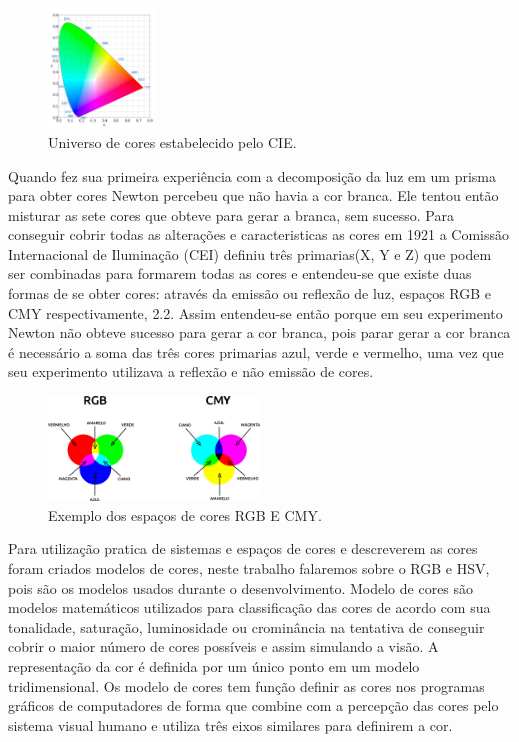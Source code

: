  \begin{figure}[!h]
	\centering
	\includegraphics[width=0.25\textwidth]{graficocie.pdf}
	\caption{Universo de cores estabelecido pelo CIE.}
	\label{EspacodeCores}
\end{figure}


Quando fez sua primeira experiência com a decomposição da luz em um prisma para obter cores Newton percebeu que não havia a cor branca. Ele tentou então misturar as sete cores que obteve para gerar a branca, sem sucesso. 
 Para conseguir cobrir todas as alterações e caracteristicas as cores em 1921 a Comissão Internacional de Iluminação (CEI)\cite{Souto:2003} definiu três primarias(X, Y e Z) que podem ser combinadas para formarem todas as cores e entendeu-se que existe duas formas de se obter cores: através da emissão ou reflexão de luz, espaços RGB e CMY respectivamente, \figurename{ 2.2}. Assim entendeu-se então porque em seu experimento Newton não obteve sucesso para gerar a cor branca, pois parar gerar a cor branca é necessário a soma das três cores primarias azul, verde e vermelho, uma vez que seu experimento utilizava a reflexão e não emissão de cores.
 \begin{figure}[!h]
	\centering
	\includegraphics[width=0.5\textwidth]{espacos.pdf}
	\caption{Exemplo dos espaços de cores RGB E CMY.}
	\label{EspacodeCores}
\end{figure}



Para utilização pratica de sistemas e espaços de cores e descreverem as cores foram criados modelos de cores, neste trabalho falaremos sobre o RGB e HSV, pois são os modelos usados durante o desenvolvimento.
Modelo de cores são modelos matemáticos utilizados para classificação das cores de acordo com sua tonalidade, saturação, luminosidade ou crominância na tentativa de conseguir cobrir o maior número de cores possíveis e assim simulando a visão. A representação da cor é definida por um único ponto em um modelo tridimensional. 
Os modelo de cores tem função definir as cores nos programas gráficos de computadores de forma que combine com a 
percepção das cores pelo sistema visual humano e utiliza três eixos similares para definirem a cor\cite{Leao:2005}.

